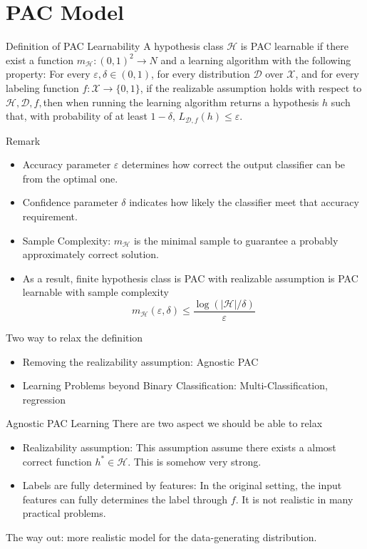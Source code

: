 \documentclass{beamer}
\begin{document}
\section{PAC Model}
\begin{frame}{Definition of PAC Learnability}
	A hypothesis class $\mathcal{H}$ is PAC learnable if there exist a function $m_{\mathcal{H}}: (0,1)^2 \rightarrow N$ and a learning algorithm with the following property: For every $\varepsilon, \delta \in (0,1)$, for every distribution $\mathcal{D}$ over $\mathcal{X}$, and for every labeling function $f: \mathcal{X} \rightarrow \{0,1\}$, if the realizable assumption holds with respect to $\mathcal{H},\mathcal{D},f,$then when running the learning algorithm returns a hypothesis $h$ such that, with probability of at least $1-\delta$, $L_{\mathcal{D},f}(h) \leq \varepsilon$. \\
\end{frame}
\begin{frame}{Remark}
	\begin{itemize}
	\item Accuracy parameter $\varepsilon$ determines how correct the output classifier can be from the optimal one.
	\item Confidence parameter $\delta$ indicates how likely the classifier meet that accuracy requirement.
	\item Sample Complexity: $m_{\mathcal{H}}$ is the minimal sample to guarantee a probably approximately correct solution.
	\item As a result, finite hypothesis class is PAC with realizable assumption is PAC learnable with sample complexity 
		\[m_{\mathcal{H}}(\varepsilon,\delta) \leq \frac{\log(|\mathcal{H}|/\delta)}{\varepsilon}\]
	\end{itemize}
\end{frame}
\begin{frame}{Two way to relax the definition}
	\begin{itemize}
			\item Removing the realizability assumption: Agnostic PAC
			\item Learning Problems beyond Binary Classification: Multi-Classification, regression
	\end{itemize}

\end{frame}
\begin{frame}{Agnostic PAC Learning}
	There are two aspect we should be able to relax
	\begin{itemize}
		\item Realizability assumption: This assumption assume there exists a almost correct function $h^* \in \mathcal{H}$. This is somehow very strong. 
		\item Labels are fully determined by features: In the original setting, the input features can fully determines the label through $f$. It is not realistic in many practical problems.
	\end{itemize}
	The way out: more realistic model for the data-generating distribution. 

\end{frame}
\end{document}
